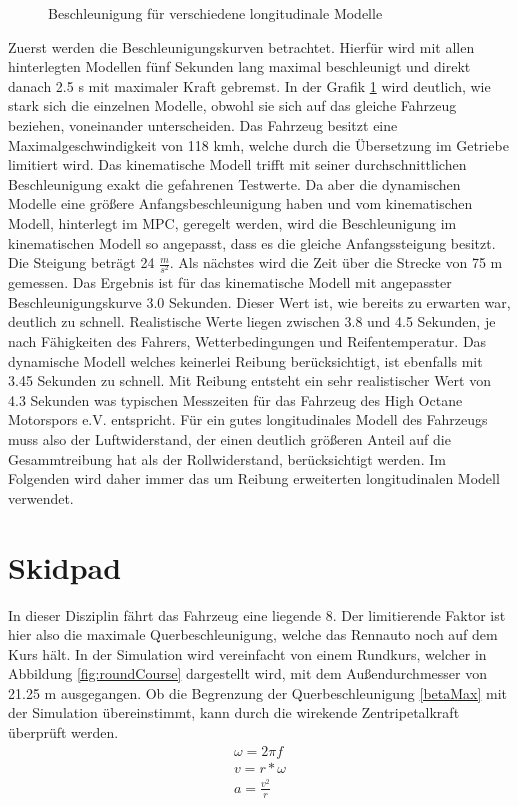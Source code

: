 \documentclass{like}
\begin{document}
\begin{figure}
	\centering
	 
	\caption{Beschleunigung für verschiedene longitudinale Modelle}
	\label{fig:accdec}
\end{figure}
Zuerst werden die Beschleunigungskurven betrachtet. Hierfür wird mit allen hinterlegten Modellen fünf Sekunden lang maximal beschleunigt und direkt danach 2.5 s mit maximaler Kraft gebremst.
In der Grafik \ref{fig:accdec} wird deutlich, wie stark sich die einzelnen Modelle, obwohl sie sich auf das gleiche Fahrzeug beziehen, voneinander unterscheiden. Das Fahrzeug besitzt eine Maximalgeschwindigkeit von 118 kmh, welche durch die Übersetzung im Getriebe limitiert wird. Das kinematische Modell trifft mit seiner durchschnittlichen Beschleunigung exakt die gefahrenen Testwerte. Da aber die dynamischen Modelle eine größere Anfangsbeschleunigung haben und vom kinematischen Modell, hinterlegt im \ac{MPC}, geregelt werden, wird die Beschleunigung im kinematischen Modell so angepasst, dass es die gleiche Anfangssteigung besitzt. Die Steigung beträgt 24 $\frac{m}{s^2}$. 
Als nächstes wird die Zeit über die Strecke von 75 m gemessen. Das Ergebnis ist für das kinematische Modell mit angepasster Beschleunigungskurve 3.0 Sekunden. Dieser Wert ist, wie bereits zu erwarten war, deutlich zu schnell. Realistische Werte liegen zwischen 3.8 und 4.5 Sekunden, je nach Fähigkeiten des Fahrers, Wetterbedingungen und Reifentemperatur. Das dynamische Modell welches keinerlei Reibung berücksichtigt, ist ebenfalls mit 3.45 Sekunden zu schnell. Mit Reibung entsteht ein sehr realistischer Wert von 4.3 Sekunden was typischen Messzeiten für das Fahrzeug des High Octane Motorspors e.V. entspricht. Für ein gutes longitudinales Modell des Fahrzeugs muss also der Luftwiderstand, der einen deutlich größeren Anteil auf die Gesammtreibung hat als der Rollwiderstand, berücksichtigt werden. Im Folgenden wird daher immer das um Reibung erweiterten longitudinalen Modell verwendet.


\section{Skidpad}
In dieser Disziplin fährt das Fahrzeug eine liegende 8. Der limitierende Faktor ist hier also die maximale Querbeschleunigung, welche das Rennauto noch auf dem Kurs hält. In der Simulation wird vereinfacht von einem Rundkurs, welcher in Abbildung \ref{fig:roundCourse} dargestellt wird, mit dem Außendurchmesser von 21.25 m ausgegangen. Ob die Begrenzung der Querbeschleunigung \ref{betaMax} mit der Simulation übereinstimmt, kann durch die wirekende Zentripetalkraft überprüft werden.
\begin{eqnarray}
	 \omega = 2 \pi f \\
	 v = r * \omega \\
	a = \frac{v^2}{r}\\
\end{eqnarray}
\end{document}
